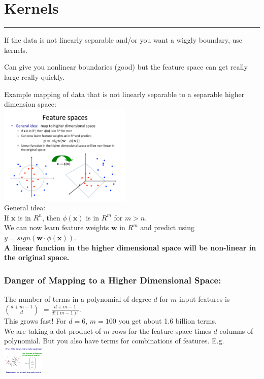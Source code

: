 \section{Kernels}
\smallskip \hrule height 2pt \smallskip
If the data is not linearly separable and/or you want a wiggly boundary, use kernels. 

Can give you nonlinear boundaries (good) but the feature space can get really large really quickly. 

Example mapping of data that is not linearly separable to a separable higher dimension space: \hfill \\
\includegraphics[width=2.5in]{figures/example_kernel_separation.pdf}  \hfill \\

General idea: \hfill \\
If $\bm{x}$ is in $R^n$, then $\phi(\bm{x})$ is in $R^m$ for $m>n$. \hfill \\
We can now learn feature weights $\bm{w}$ in $R^m$ and predict using $y = sign(\bm{w} \cdot \phi(\bm{x}))$. \hfill \\
\textbf{A linear function in the higher dimensional space will be non-linear in the original space.}  \hfill \\

\subsubsection{Danger of Mapping to a Higher Dimensional Space:}
The number of terms in a polynomial of degree $d$ for $m$ input features is 
$\displaystyle {d + m - 1}\choose{d} $ $ \displaystyle = \frac{d + m - 1}{d!(m-1)!}$. \hfill \\
This grows fast!  For $d=6$, $m=100$ you get about 1.6 billion terms.  \hfill \\

We are taking a dot product of $m$ rows for the feature space times $d$ columns of polynomial. 
But you also have terms for combinations of features.  E.g. 
\includegraphics[width=0.8in]{figures/example_kernel.pdf}

